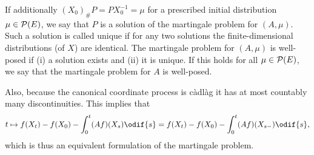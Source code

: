If additionally \( (X_0)_\# P = P X_0^{-1} = \mu \) for a prescribed initial distribution \(\mu \in \mathcal{P}(E)\), we say that \(P\) is a solution of the martingale problem for \((A,\mu)\).
Such a solution is called unique if for any two solutions the finite-dimensional distributions (of \(X\)) are identical.
The martingale problem for \((A,\mu)\) is well-posed if (i) a solution exists and (ii) it is unique.
If this holds for all \(\mu \in \mathcal{P}(E)\), we say that the martingale problem for \(A\) is well-posed.

Also, because the canonical coordinate process is càdlàg it has at most countably many discontinuities.
This implies that
\begin{equation}\label{eq:mart-problem-s-}
  t \mapsto f(X_t) - f(X_0) - \int_0^t (Af)(X_s) \odif{s}
  = f(X_t) - f(X_0) - \int_0^t (Af)(X_{s-}) \odif{s},
\end{equation}
which is thus an equivalent formulation of the martingale problem.
